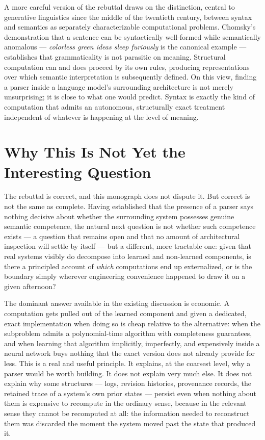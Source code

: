 \documentclass[11pt]{book}
\theoremstyle{plain}
\theoremstyle{definition}
\theoremstyle{remark}
\begin{document}
A more careful version of the rebuttal draws on the distinction,
central to generative linguistics since the middle of the twentieth
century, between syntax and semantics as separately characterizable
computational problems. Chomsky's demonstration that a sentence can be
syntactically well-formed while semantically anomalous ---
\emph{colorless green ideas sleep furiously} is the canonical example
--- establishes that grammaticality is not parasitic on meaning.
Structural computation can and does proceed by its own rules,
producing representations over which semantic interpretation is
subsequently defined. On this view, finding a parser inside a language
model's surrounding architecture is not merely unsurprising; it is
close to what one would predict. Syntax is exactly the kind of
computation that admits an autonomous, structurally exact treatment
independent of whatever is happening at the level of meaning.

\section{Why This Is Not Yet the Interesting Question}

The rebuttal is correct, and this monograph does not dispute it. But
correct is not the same as complete. Having established that the
presence of a parser says nothing decisive about whether the
surrounding system possesses genuine semantic competence, the natural
next question is not whether such competence exists --- a question
that remains open and that no amount of architectural inspection will
settle by itself --- but a different, more tractable one: given that
real systems visibly do decompose into learned and non-learned
components, is there a principled account of \emph{which}
computations end up externalized, or is the boundary simply wherever
engineering convenience happened to draw it on a given afternoon?

The dominant answer available in the existing discussion is economic.
A computation gets pulled out of the learned component and given a
dedicated, exact implementation when doing so is cheap relative to the
alternative: when the subproblem admits a polynomial-time algorithm
with completeness guarantees, and when learning that algorithm
implicitly, imperfectly, and expensively inside a neural network buys
nothing that the exact version does not already provide for less. This
is a real and useful principle. It explains, at the coarsest level, why
a parser would be worth building. It does not explain very much else.
It does not explain why some structures --- logs, revision histories,
provenance records, the retained trace of a system's own prior states
--- persist even when nothing about them is expensive to recompute in
the ordinary sense, because in the relevant sense they cannot be
recomputed at all: the information needed to reconstruct them was
discarded the moment the system moved past the state that produced it.
\end{document}
